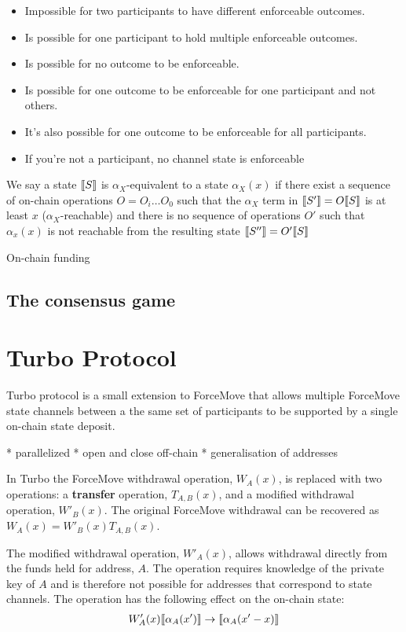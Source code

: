 \begin{itemize}
  \item Impossible for two participants to have different enforceable outcomes.
  \item Is possible for one participant to hold multiple enforceable outcomes.
  \item Is possible for no outcome to be enforceable.
  \item Is possible for one outcome to be enforceable for one participant and not others.
  \item It's also possible for one outcome to be enforceable for all participants.
  \item If you're not a participant, no channel state is enforceable
\end{itemize}


We say a state $\llbracket S \rrbracket$ is $\alpha_X$-equivalent to a state $\alpha_X(x)$ if there exist
a sequence of on-chain operations $O = O_i \dots O_0$ such that the $\alpha_X$ term in
$\llbracket S' \rrbracket = O\llbracket S \rrbracket$ is at least $x$ ($\alpha_X$-reachable) and there is no sequence of
operations $O'$ such that $\alpha_x(x)$ is not reachable from the resulting state
$\llbracket S'' \rrbracket = O'\llbracket S \rrbracket$ 

On-chain funding

\subsection{The consensus game}


\section{Turbo Protocol}

Turbo protocol is a small extension to ForceMove that allows multiple ForceMove state
channels between a the same set of participants to be supported by a single on-chain
state deposit.

* parallelized
* open and close off-chain
* generalisation of addresses

In Turbo the ForceMove withdrawal operation, $W_A(x)$, is replaced with two operations: a
\textbf{transfer} operation, $T_{A,B}(x)$, and a modified withdrawal operation, $W'_B(x)$.
The original ForceMove withdrawal can be recovered as $W_A(x) = W'_B(x)T_{A,B}(x)$.

The modified withdrawal operation, $W'_A(x)$, allows withdrawal directly from the funds
held for address, $A$. The operation requires knowledge of the private key of $A$ and is
therefore not possible for addresses that correspond to state channels. The operation has
the following effect on the on-chain state:
\begin{align*}
W'_A(x) \llbracket \alpha_A(x') \rrbracket \rightarrow \llbracket \alpha_A(x'-x) \rrbracket
\end{align*}

